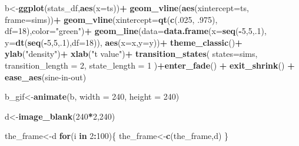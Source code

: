 \documentclass[
]{book}
\newenvironment{Shaded}{\begin{snugshade}}{\end{snugshade}}
\newcommand{\AttributeTok}[1]{\textcolor[rgb]{0.13,0.29,0.53}{#1}}
\newcommand{\ControlFlowTok}[1]{\textcolor[rgb]{0.13,0.29,0.53}{\textbf{#1}}}
\newcommand{\DecValTok}[1]{\textcolor[rgb]{0.00,0.00,0.81}{#1}}
\newcommand{\FunctionTok}[1]{\textcolor[rgb]{0.13,0.29,0.53}{\textbf{#1}}}
\newcommand{\NormalTok}[1]{#1}
\newcommand{\OtherTok}[1]{\textcolor[rgb]{0.56,0.35,0.01}{#1}}
\newcommand{\SpecialCharTok}[1]{\textcolor[rgb]{0.81,0.36,0.00}{\textbf{#1}}}
\newcommand{\StringTok}[1]{\textcolor[rgb]{0.31,0.60,0.02}{#1}}
\begin{document}
\begin{Shaded}
\begin{Highlighting}[]
\NormalTok{b}\OtherTok{\textless{}{-}}\FunctionTok{ggplot}\NormalTok{(stats\_df,}\FunctionTok{aes}\NormalTok{(}\AttributeTok{x=}\NormalTok{ts))}\SpecialCharTok{+}
  \FunctionTok{geom\_vline}\NormalTok{(}\FunctionTok{aes}\NormalTok{(}\AttributeTok{xintercept=}\NormalTok{ts, }\AttributeTok{frame=}\NormalTok{sims))}\SpecialCharTok{+}
  \FunctionTok{geom\_vline}\NormalTok{(}\AttributeTok{xintercept=}\FunctionTok{qt}\NormalTok{(}\FunctionTok{c}\NormalTok{(.}\DecValTok{025}\NormalTok{, .}\DecValTok{975}\NormalTok{), }\AttributeTok{df=}\DecValTok{18}\NormalTok{),}\AttributeTok{color=}\StringTok{"green"}\NormalTok{)}\SpecialCharTok{+}
  \FunctionTok{geom\_line}\NormalTok{(}\AttributeTok{data=}\FunctionTok{data.frame}\NormalTok{(}\AttributeTok{x=}\FunctionTok{seq}\NormalTok{(}\SpecialCharTok{{-}}\DecValTok{5}\NormalTok{,}\DecValTok{5}\NormalTok{,.}\DecValTok{1}\NormalTok{),}
                            \AttributeTok{y=}\FunctionTok{dt}\NormalTok{(}\FunctionTok{seq}\NormalTok{(}\SpecialCharTok{{-}}\DecValTok{5}\NormalTok{,}\DecValTok{5}\NormalTok{,.}\DecValTok{1}\NormalTok{),}\AttributeTok{df=}\DecValTok{18}\NormalTok{)),}
            \FunctionTok{aes}\NormalTok{(}\AttributeTok{x=}\NormalTok{x,}\AttributeTok{y=}\NormalTok{y))}\SpecialCharTok{+}
  \FunctionTok{theme\_classic}\NormalTok{()}\SpecialCharTok{+}
  \FunctionTok{ylab}\NormalTok{(}\StringTok{"density"}\NormalTok{)}\SpecialCharTok{+}
  \FunctionTok{xlab}\NormalTok{(}\StringTok{"t value"}\NormalTok{)}\SpecialCharTok{+}
  \FunctionTok{transition\_states}\NormalTok{(}
    \AttributeTok{states=}\NormalTok{sims,}
    \AttributeTok{transition\_length =} \DecValTok{2}\NormalTok{,}
    \AttributeTok{state\_length =} \DecValTok{1}
\NormalTok{  )}\SpecialCharTok{+}\FunctionTok{enter\_fade}\NormalTok{() }\SpecialCharTok{+} 
  \FunctionTok{exit\_shrink}\NormalTok{() }\SpecialCharTok{+}
  \FunctionTok{ease\_aes}\NormalTok{(}\StringTok{\textquotesingle{}sine{-}in{-}out\textquotesingle{}}\NormalTok{)}

\NormalTok{b\_gif}\OtherTok{\textless{}{-}}\FunctionTok{animate}\NormalTok{(b, }\AttributeTok{width =} \DecValTok{240}\NormalTok{, }\AttributeTok{height =} \DecValTok{240}\NormalTok{)}


\NormalTok{d}\OtherTok{\textless{}{-}}\FunctionTok{image\_blank}\NormalTok{(}\DecValTok{240}\SpecialCharTok{*}\DecValTok{2}\NormalTok{,}\DecValTok{240}\NormalTok{)}

\NormalTok{the\_frame}\OtherTok{\textless{}{-}}\NormalTok{d}
\ControlFlowTok{for}\NormalTok{(i }\ControlFlowTok{in} \DecValTok{2}\SpecialCharTok{:}\DecValTok{100}\NormalTok{)\{}
\NormalTok{  the\_frame}\OtherTok{\textless{}{-}}\FunctionTok{c}\NormalTok{(the\_frame,d)}
\NormalTok{\}}


\end{Highlighting}
\end{Shaded}
\end{document}
